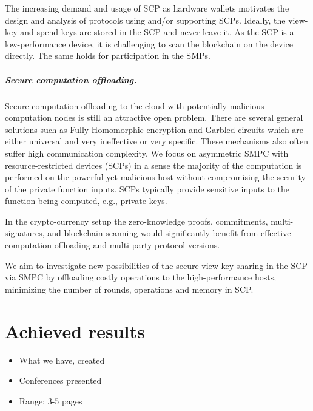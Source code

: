 \documentclass[
  digital, %
  twoside, %
  table,   %
  lof,     %
  lot,     %
]{fithesis3}
\theoremstyle{definition}
\theoremstyle{remark}
\begin{document}
\begin{ecmmnt}
The increasing demand and usage of SCP as hardware wallets motivates the design and analysis of protocols using and/or supporting SCPs. Ideally, the view-key and spend-keys are stored in the SCP and never leave it. As the SCP is a low-performance device, it is challenging to scan the blockchain on the device directly. The same holds for participation in the SMPs.

\paragraph{Secure computation offloading.}
Secure computation offloading to the cloud with potentially malicious computation nodes is still an attractive open problem. There are several general solutions such as Fully Homomorphic encryption and Garbled circuits which are either universal and very ineffective or very specific. These mechanisms also often suffer high communication complexity. 
We focus on asymmetric SMPC with resource-restricted devices (SCPs) in a sense the majority of the computation is performed on the powerful yet malicious host without compromising the security of the private function inputs. SCPs typically provide sensitive inputs to the function being computed, e.g., private keys. 

In the crypto-currency setup the zero-knowledge proofs, commitments, multi-signatures, and blockchain scanning would significantly benefit from effective computation offloading and multi-party protocol versions.

We aim to investigate new possibilities of the secure view-key sharing in the SCP via SMPC by offloading costly operations to the high-performance hosts, minimizing the number of rounds, operations and memory in SCP.
\end{ecmmnt}


\chapter{Achieved results}
\begin{shaded}
\begin{itemize}
    \item What we have, created
    \item Conferences presented
    \item Range: 3-5 pages
\end{itemize}
\end{shaded}
\end{document}
